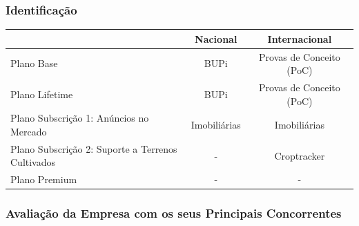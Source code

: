 \documentclass[11pt]{article}
\begin{document}
	\subsubsection{Identificação}
	
	\normalsize
	
	\begin{center}
		\begin{tabular}{ | p{} | c | c | }
			\hline
			& Nacional & Internacional \\
			\hline
			Plano Base & BUPi & Provas de Conceito (PoC) \\
			\hline
			Plano Lifetime & BUPi & Provas de Conceito (PoC) \\
			\hline
			Plano Subscrição 1: Anúncios no Mercado & Imobiliárias & Imobiliárias \\
			\hline 
			Plano Subscrição 2: Suporte a Terrenos Cultivados & - & Croptracker \\
			\hline   
			Plano Premium & - & - \\
			\hline
		\end{tabular}
	\end{center}

	\pagebreak
	
	\large
	\subsubsection{Avaliação da Empresa com os seus Principais Concorrentes}
	\normalsize
	
\end{document}
